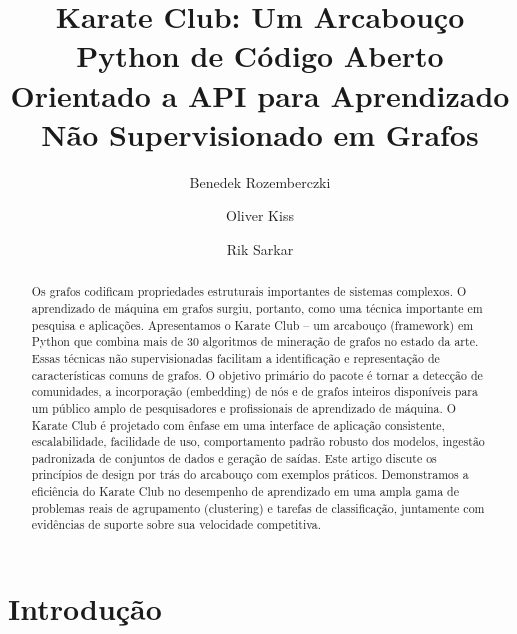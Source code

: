 \documentclass[sigconf]{acmart}
\begin{document}
\title{Karate Club: Um Arcabouço Python de Código Aberto Orientado a API para Aprendizado Não Supervisionado em Grafos}

\author{Benedek Rozemberczki}

\author{Oliver Kiss}

\author{Rik Sarkar}

\begin{abstract}
Os grafos codificam propriedades estruturais importantes de sistemas complexos. O aprendizado de máquina em grafos surgiu, portanto, como uma técnica importante em pesquisa e aplicações. Apresentamos o Karate Club -- um arcabouço (framework) em Python que combina mais de 30 algoritmos de mineração de grafos no estado da arte. Essas técnicas não supervisionadas facilitam a identificação e representação de características comuns de grafos. O objetivo primário do pacote é tornar a detecção de comunidades, a incorporação (embedding) de nós e de grafos inteiros disponíveis para um público amplo de pesquisadores e profissionais de aprendizado de máquina. O Karate Club é projetado com ênfase em uma interface de aplicação consistente, escalabilidade, facilidade de uso, comportamento padrão robusto dos modelos, ingestão padronizada de conjuntos de dados e geração de saídas. Este artigo discute os princípios de design por trás do arcabouço com exemplos práticos. Demonstramos a eficiência do Karate Club no desempenho de aprendizado em uma ampla gama de problemas reais de agrupamento (clustering) e tarefas de classificação, juntamente com evidências de suporte sobre sua velocidade competitiva.
\end{abstract}


\maketitle

\section{Introdução}
\end{document}
